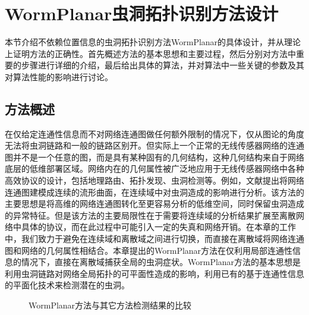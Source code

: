 \section{WormPlanar虫洞拓扑识别方法设计}
本节介绍不依赖位置信息的虫洞拓扑识别方法WormPlanar的具体设计，并从理论上证明方法的正确性。首先概述方法的基本思想和主要过程，然后分别对方法中重要的步骤进行详细的介绍，最后给出具体的算法，并对算法中一些关键的参数及其对算法性能的影响进行讨论。
\subsection{方法概述}
在仅给定连通性信息而不对网络连通图做任何额外限制的情况下，仅从图论的角度无法将虫洞链路和一般的链路区别开。但实际上一个正常的无线传感器网络的连通图并不是一个任意的图，而是具有某种固有的几何结构，这种几何结构来自于网络底层的低维部署区域。网络内在的几何属性被广泛地应用于无线传感器网络中各种高效协议的设计，包括地理路由、拓扑发现、虫洞检测等。例如，文献提出将网络连通图建模成连续的流形曲面，在连续域中对虫洞造成的影响进行分析。该方法的主要思想是将高维的网络连通图转化至更容易分析的低维空间，同时保留虫洞造成的异常特征。但是该方法的主要局限性在于需要将连续域的分析结果扩展至离散网络中具体的协议，而在此过程中可能引入一定的失真和网络开销。在本章的工作中，我们致力于避免在连续域和离散域之间进行切换，而直接在离散域将网络连通图和网络的几何属性相结合。本章提出的WormPlanar方法在仅利用局部连通性信息的情况下，直接在离散域捕获全局的虫洞症状。WormPlanar方法的基本思想是利用虫洞链路对网络全局拓扑的可平面性造成的影响，利用已有的基于连通性信息的平面化技术来检测潜在的虫洞。
\begin{figure}[t]
  \centering
  \hspace{0.5em}%
  \hspace{0.5em}%
  \hspace{0.5em}%
  \hspace{0.5em}%
  \caption{WormPlanar方法与其它方法检测结果的比较}
  \label{fig:403}
\end{figure}

